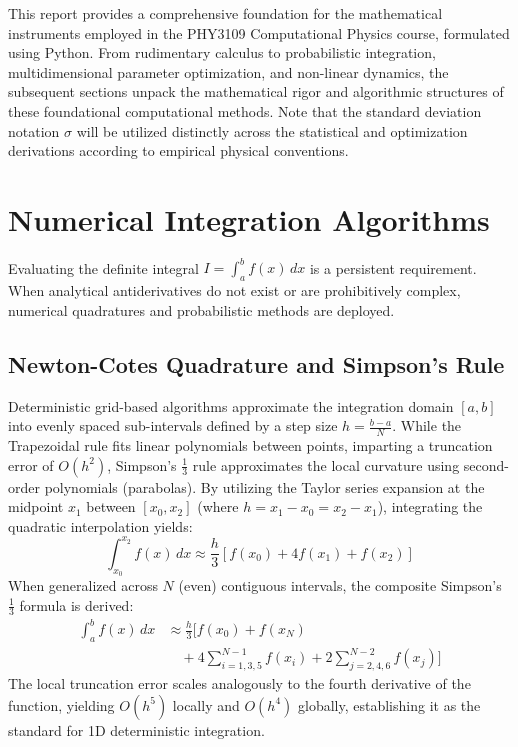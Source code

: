 \documentclass[aps, reprint, twocolumn, superscriptaddress, floatfix]{revtex4-2}
\begin{document}
This report provides a comprehensive foundation for the mathematical instruments employed in the PHY3109 Computational Physics course, formulated using Python. From rudimentary calculus to probabilistic integration, multidimensional parameter optimization, and non-linear dynamics, the subsequent sections unpack the mathematical rigor and algorithmic structures of these foundational computational methods. Note that the standard deviation notation $\sigma$ will be utilized distinctly across the statistical and optimization derivations according to empirical physical conventions.

\section{Numerical Integration Algorithms}

Evaluating the definite integral $I = \int_{a}^{b} f(x) \, dx$ is a persistent requirement. When analytical antiderivatives do not exist or are prohibitively complex, numerical quadratures and probabilistic methods are deployed.

\subsection{Newton-Cotes Quadrature and Simpson's Rule}
Deterministic grid-based algorithms approximate the integration domain $[a, b]$ into evenly spaced sub-intervals defined by a step size $h = \frac{b-a}{N}$. While the Trapezoidal rule fits linear polynomials between points, imparting a truncation error of $O(h^2)$, Simpson's $\frac{1}{3}$ rule approximates the local curvature using second-order polynomials (parabolas). By utilizing the Taylor series expansion at the midpoint $x_1$ between $[x_0, x_2]$ (where $h = x_1 - x_0 = x_2 - x_1$), integrating the quadratic interpolation yields:
\begin{equation}
    \int_{x_0}^{x_2} f(x) \, dx \approx \frac{h}{3} \left[ f(x_0) + 4f(x_1) + f(x_2) \right]
\end{equation}
When generalized across $N$ (even) contiguous intervals, the composite Simpson's $\frac{1}{3}$ formula is derived:
\begin{equation}
\begin{aligned}
    \int_{a}^{b} f(x) \, dx &\approx \frac{h}{3} \Bigg[ f(x_0) + f(x_N) \\
    &\quad + 4\sum_{i=1,3,5}^{N-1} f(x_i) + 2\sum_{j=2,4,6}^{N-2} f(x_j) \Bigg]
\end{aligned}
\end{equation}
The local truncation error scales analogously to the fourth derivative of the function, yielding $O(h^5)$ locally and $O(h^4)$ globally, establishing it as the standard for 1D deterministic integration.
\end{document}
